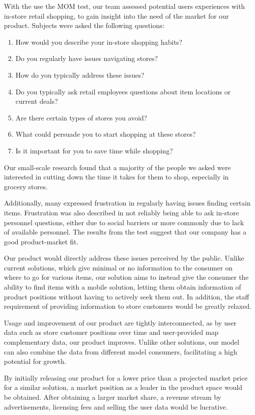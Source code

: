 \documentclass[titlepage]{article}
\begin{document}
With the use the MOM test, our team assessed potential users experiences with in-store retail shopping, to gain insight into the need of the market for our product. Subjects were asked the following questions:
\begin{enumerate}
    \item How would you describe your in-store shopping habits?
    \item Do you regularly have issues navigating stores?
    \item How do you typically address these issues?
    \item Do you typically ask retail employees questions about item locations or current deals?
    \item Are there certain types of stores you avoid?
    \item What could persuade you to start shopping at these stores?
    \item Is it important for you to save time while shopping?
\end{enumerate}
Our small-scale research found that a majority of the people we asked were interested in cutting down the time it takes for them to shop, especially in grocery stores. 

Additionally, many expressed frustration in regularly having issues finding certain items. Frustration was also described in not reliably being able to ask in-store personnel questions, either due to social barriers or more commonly due to lack of available personnel. The results from the test suggest that our company has a good product-market fit.

Our product would directly address these issues perceived by the public. Unlike current solutions, which give minimal or no information to the consumer on where to go for various items,
our solution aims to instead give the consumer the ability to find items with a mobile solution,
letting them obtain information of product positions without having to actively seek them out.
In addition, the staff requirement of providing information to store customers would be greatly relaxed.

Usage and improvement of our product are tightly interconnected, as by user data such as store customer positions over time 
and user-provided map complementary data, our product improves. 
Unlike other solutions, our model can also combine the data from different model consumers, 
facilitating a high potential for growth.

By initially releasing our product for a lower price than a projected market price for a similar solution,
a market position as a leader in the product space would be obtained.
After obtaining a larger market share, a revenue stream by advertisements, 
licensing fees and selling the user data would be lucrative.
\end{document}
